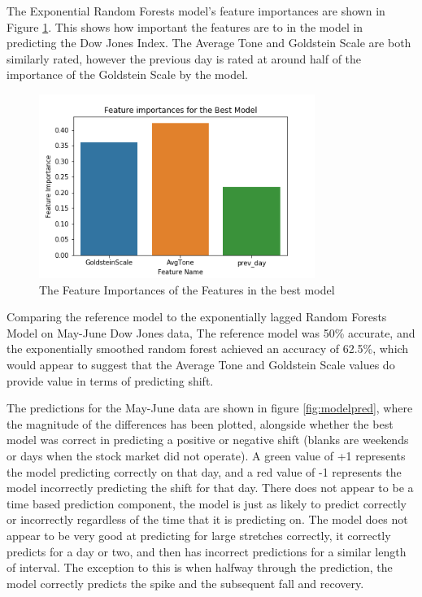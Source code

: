 The Exponential Random Forests model's feature importances are shown in Figure \ref{fig:featimport}. This shows how important the features are to in the model in predicting the Dow Jones Index. The Average Tone and Goldstein Scale are both similarly rated, however the previous day is rated at around half of the importance of the Goldstein Scale by the model.
\begin{figure}[H]
	\centering
	\includegraphics[width=0.8\textwidth]{images/feature_importance.png}
	\caption{The Feature Importances of the Features in the best model}
	\label{fig:featimport}
\end{figure}


Comparing the reference model to the exponentially lagged Random Forests Model on May-June Dow Jones data, The reference model was 50\% accurate, and the exponentially smoothed random forest achieved an accuracy of 62.5\%, which would appear to suggest that the Average Tone and Goldstein Scale values do provide value in terms of predicting shift. 

The predictions for the May-June data are shown in figure \ref{fig:modelpred}, where the magnitude of the differences has been plotted, alongside whether the best model was correct in predicting a positive or negative shift (blanks are weekends or days when the stock market did not operate). A green value of +1 represents the model predicting correctly on that day, and a red value of -1 represents the model incorrectly predicting the shift for that day. There does not appear to be a time based prediction component, the model is just as likely to predict correctly or incorrectly regardless of the time that it is predicting on. The model does not appear to be very good at predicting for large stretches correctly, it correctly predicts for a day or two, and then has incorrect predictions for a similar length of interval. The exception to this is when halfway through the prediction, the model correctly predicts the spike and the subsequent fall and recovery. 


